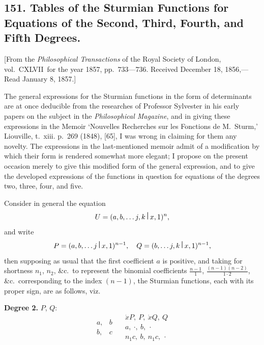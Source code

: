 \documentclass[11pt,a4paper]{book}
\begin{document}
\begin{center}
\newpage

\section*{151. Tables of the Sturmian Functions for Equations of the Second, Third, Fourth, and Fifth Degrees.}

[From the \textit{Philosophical Transactions} of the Royal Society of London, vol.~CXLVII\ for the year 1857, pp.~733---736.
Received December 18, 1856,---Read January 8, 1857.]

\bigskip

The general expressions for the Sturmian functions in the form of determinants are at once deducible from the researches of Professor Sylvester in his early papers on the subject in the \textit{Philosophical Magazine}, and in giving these expressions in the Memoir `Nouvelles Recherches sur les Fonctions de M.~Sturm,' Liouville, t.~xiii. p.~269 (1848), [65], I was wrong in claiming for them any novelty. The expressions in the last-mentioned memoir admit of a modification by which their form is rendered somewhat more elegant; I propose on the present occasion merely to give this modified form of the general expression, and to give the developed expressions of the functions in question for equations of the degrees two, three, four, and five.

Consider in general the equation
\[U=(a,b,\ldots j,k\,\raisebox{0.5ex}{\textbf{\textbar}}\,x,1)^n,\]
and write
\[P=(a,b,\ldots j\,\raisebox{0.5ex}{\textbf{\textbar}}\,x,1)^{n-1},\quad Q=(b,\ldots j,k\,\raisebox{0.5ex}{\textbf{\textbar}}\,x,1)^{n-1},\]
then supposing as usual that the first coefficient $a$ is positive, and taking for shortness $n_1$, $n_2$, \&c.\ to represent the binomial coefficients $\frac{n-1}{1}$, $\frac{(n-1)(n-2)}{1\cdot2}$, \&c.\ corresponding to the index $(n-1)$, the Sturmian functions, each with its proper sign, are as follows, viz.

\medskip

\noindent\textbf{Degree 2.} $P$, $Q$:
\[
\begin{array}{cc}
a, & b \\
b, & c
\end{array}
\quad
\begin{array}{c}
\dot{x}P,\ P,\ \dot{x}Q,\ Q \\
a,\ \cdot,\ b,\ \cdot \\
n_1 c,\ b,\ n_1 c,\ \cdot
\end{array}
\]


\end{center}
\end{document}
